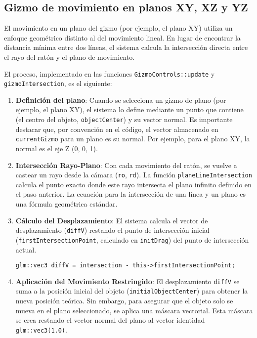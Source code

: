 \subsection{Gizmo de movimiento en planos XY, XZ y YZ}

El movimiento en un plano del gizmo (por ejemplo, el plano XY) utiliza un
enfoque geométrico distinto al del movimiento lineal. En lugar de encontrar la
distancia mínima entre dos líneas, el sistema calcula la intersección directa
entre el rayo del ratón y el plano de movimiento.

El proceso, implementado en las funciones \texttt{GizmoControls::update} y
\texttt{gizmoIntersection}, es el siguiente:

\begin{enumerate}
    \item \textbf{Definición del plano}: Cuando se selecciona un gizmo de plano (por ejemplo, el plano XY), el sistema lo define mediante un punto que contiene (el centro del objeto, \texttt{objectCenter}) y su vector normal. Es importante destacar que, por convención en el código, el vector almacenado en \texttt{currentGizmo} para un plano es su normal. Por ejemplo, para el plano XY, la normal es el eje Z (0, 0, 1).
    \item \textbf{Intersección Rayo-Plano}: Con cada movimiento del ratón, se vuelve a castear un rayo desde la cámara (\texttt{ro}, \texttt{rd}). La función \texttt{planeLineIntersection} calcula el punto exacto donde este rayo intersecta el plano infinito definido en el paso anterior. La ecuación para la intersección de una línea y un plano es una fórmula geométrica estándar.
    \item \textbf{Cálculo del Desplazamiento}: El sistema calcula el vector de desplazamiento (\texttt{diffV}) restando el punto de intersección inicial (\texttt{firstIntersectionPoint}, calculado en \texttt{initDrag}) del punto de intersección actual.
          \begin{verbatim}
glm::vec3 diffV = intersection - this->firstIntersectionPoint;
    \end{verbatim}
    \item \textbf{Aplicación del Movimiento Restringido}: El desplazamiento \texttt{diffV} se suma a la posición inicial del objeto (\texttt{initialObjectCenter}) para obtener la nueva posición teórica. Sin embargo, para asegurar que el objeto solo se mueva en el plano seleccionado, se aplica una máscara vectorial. Esta máscara se crea restando el vector normal del plano al vector identidad \texttt{glm::vec3(1.0)}.

\end{enumerate}
